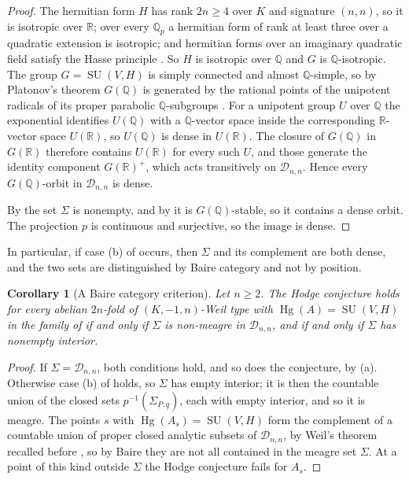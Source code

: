 \documentclass[11pt,reqno]{amsart}
\theoremstyle{plain}
\newtheorem{corollary}[theorem]{Corollary}
\theoremstyle{definition}
\theoremstyle{remark}
\newcommand{\QQ}{\mathbb{Q}}
\newcommand{\RR}{\mathbb{R}}
\newcommand{\cD}{\mathcal{D}}
\DeclareMathOperator{\Hg}{Hg}
\DeclareMathOperator{\SU}{SU}
\begin{document}
\begin{proof}
The hermitian form $H$ has rank $2n\ge4$ over $K$ and signature $(n,n)$, so it
is isotropic over $\RR$; over every $\QQ_{p}$ a hermitian form of rank at
least three over a quadratic extension is isotropic; and hermitian forms over
an imaginary quadratic field satisfy the Hasse principle
\cite[Ch.~10, \S 6]{Sch85}. So $H$ is isotropic over $\QQ$ and $G$ is
$\QQ$-isotropic. The group $G=\SU(V,H)$ is simply connected and almost
$\QQ$-simple, so by Platonov's theorem $G(\QQ)$ is generated by the rational
points of the unipotent radicals of its proper parabolic $\QQ$-subgroups
\cite[Thm.~7.6 and \S 7.2]{PR94}. For a unipotent group $U$ over $\QQ$ the
exponential identifies $U(\QQ)$ with a $\QQ$-vector space inside the
corresponding $\RR$-vector space $U(\RR)$, so $U(\QQ)$ is dense in $U(\RR)$.
The closure of $G(\QQ)$ in $G(\RR)$ therefore contains $U(\RR)$ for every such
$U$, and those generate the identity component $G(\RR)^{+}$, which acts
transitively on $\cD_{n,n}$. Hence every $G(\QQ)$-orbit in $\cD_{n,n}$ is
dense.

By  the set $\Sigma$ is nonempty, and by
 it is $G(\QQ)$-stable, so it contains a dense orbit.
The projection $p$ is continuous and surjective, so the image is dense.
\end{proof}

In particular, if case (b) of  occurs, then $\Sigma$
and its complement are both dense, and the two sets are distinguished by
Baire category and not by position.

\begin{corollary}[A Baire category criterion]\label{cor:meagre}
Let $n\ge2$. The Hodge conjecture holds for every abelian $2n$-fold of
$(K,-1,n)$-Weil type with $\Hg(A)=\SU(V,H)$ in the family of
 if and only if $\Sigma$ is non-meagre in $\cD_{n,n}$, and
if and only if $\Sigma$ has nonempty interior.
\end{corollary}

\begin{proof}
If $\Sigma=\cD_{n,n}$, both conditions hold, and so does the conjecture, by
(a). Otherwise case (b) of  holds,
so $\Sigma$ has empty interior; it is then the countable union of the closed
sets $p^{-1}(\Sigma_{\underline{P},\underline{q}})$, each with empty interior,
and so it is meagre. The points $s$ with $\Hg(A_{s})=\SU(V,H)$ form the
complement of a countable union of proper closed analytic subsets of $\cD_{n,n}$, by
Weil's theorem \cite{Weil77} recalled before , so by Baire
they are not all contained in the meagre set $\Sigma$. At a point of this
kind outside $\Sigma$ the Hodge conjecture fails for $A_{s}$.
\end{proof}
\end{document}
